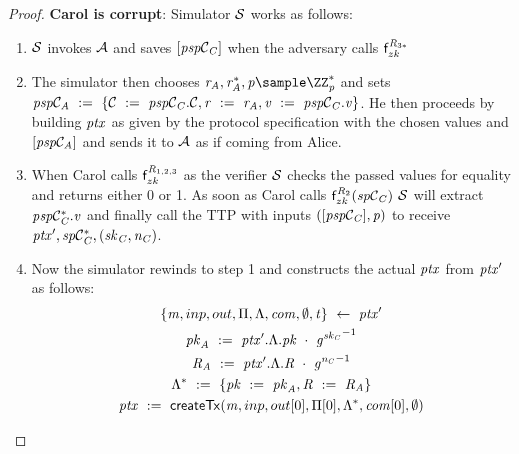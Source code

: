 \begin{proof}
    \textbf{Carol is corrupt}: Simulator $\mathcal{S}$ works as follows:
    \begin{enumerate}
        \item $\mathcal{S}$ invokes $\mathcal{A}$ and saves $[\mathit{psp}\mathcal{C}_{\mathit{C}}]$ when the adversary calls $\mathsf{f}^{\mathit{R}_{3*}}_{zk}$
        \item The simulator then chooses $\varBlindingFactorAlice, \funStar{\varBlindingFactorAlice}, \varFundValue \sample \cnstIntegersPrimeWithoutZero{\varPrime}$ and sets \\ $\mathit{psp}\mathcal{C}_{\mathit{A}} ~:=~ \{ \mathcal{C} ~:=~ \mathit{psp}\mathcal{C}_{\mathit{C}}.\mathcal{C}, \mathit{r} ~:=~ \mathit{r}_{\mathit{A}}, \mathit{v} ~:=~ \mathit{psp}\mathcal{C}_{\mathit{C}}.\mathit{v} \}$.
        He then proceeds by building $\mathit{ptx}$ as given by the protocol specification with the chosen values and $[\mathit{psp}\mathcal{C}_{\mathit{A}}]$ and sends it to $\mathcal{A}$ as if coming from Alice.
        \item When Carol calls $\mathsf{f}^{\mathit{R}_{1,2,3}}_{zk}$ as the verifier $\mathcal{S}$ checks the passed values for equality and returns either 0 or 1.
        As soon as Carol calls $\mathsf{f}^{\mathit{R}_{2}}_{zk}(\mathit{sp}\mathcal{C}_{\mathit{C}})$ $\mathcal{S}$ will extract $\mathit{p} \mathit{sp}\mathcal{C}_{\mathit{C}}^*.\mathit{v}$ and finally call the TTP with inputs $([\mathit{psp}\mathcal{C}_{\mathit{C}}], \mathit{p})$ to receive ${\mathit{ptx}}', \mathit{sp}\mathcal{C}_{\mathit{C}}^*, (\mathit{sk}_{\mathit{C}}, \mathit{\mathit{n}_{\mathit{C}}})$.
        \item Now the simulator rewinds to step 1 and constructs the actual $\mathit{ptx}$ from ${\mathit{ptx}}'$ as follows:
        \begin{gather*}
            \{ \varMsg, \varInputs, \varOutputs, \varProofs, \varSigContext, \varCommits, \cnstEmptySet, \varTime \} \opFunResult \funStarAlt{\varPreTx} \\
            \varPubKeyAlice \opAssign \funStarAlt{\varPreTx}.\varSigContext.\varPubKey \opAddPoint {\funGen{\varSecKeyCarol}}^{-1} \\
            \varRandAlice \opAssign \funStarAlt{\varPreTx}.\varSigContext.\varRand \opAddPoint {\funGen{\varNonceCarol}}^{-1} \\
            \funStar{\varSigContext} \opAssign \{ \varPubKey \opAssign \varPubKeyAlice, \varRand \opAssign \varRandAlice \} \\
            \varPreTx \opAssign \procCreatePreTx{\varMsg}{\varInputs}{\varOutputs[0]}{\varProofs[0]}{\funStar{\varSigContext}}{\varCommits[0]}{\cnstEmptySet}{\varTime}

\end{gather*}
\end{enumerate}
\end{proof}
